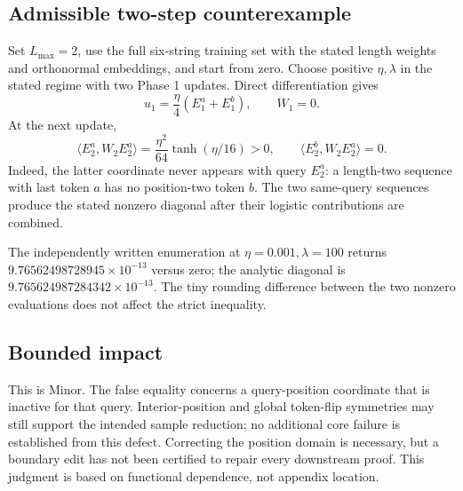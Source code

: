 \documentclass[10pt]{article}
\begin{document}
\subsection*{Admissible two-step counterexample}
Set \(L_{\max}=2\), use the full six-string training set with the stated length weights and orthonormal embeddings, and start from zero. Choose positive \(\eta,\lambda\) in the stated regime with two Phase 1 updates. Direct differentiation gives \[u_1=\frac{\eta}{4}(E_1^a+E_1^b),\qquad W_1=0.\] At the next update, \[\langle E_2^a,W_2E_2^a\rangle
=\frac{\eta^2}{64}\tanh(\eta/16)>0,\qquad
\langle E_2^b,W_2E_2^a\rangle=0.\] Indeed, the latter coordinate never appears with query \(E_2^a\): a length-two sequence with last token \(a\) has no position-two token \(b\). The two same-query sequences produce the stated nonzero diagonal after their logistic contributions are combined.\par
The independently written enumeration at \(\eta=0.001,\lambda=100\) returns \(9.76562498728945\times10^{-13}\) versus zero; the analytic diagonal is \(9.765624987284342\times10^{-13}\). The tiny rounding difference between the two nonzero evaluations does not affect the strict inequality.\par
\subsection*{Bounded impact}
This is Minor. The false equality concerns a query-position coordinate that is inactive for that query. Interior-position and global token-flip symmetries may still support the intended sample reduction; no additional core failure is established from this defect. Correcting the position domain is necessary, but a boundary edit has not been certified to repair every downstream proof. This judgment is based on functional dependence, not appendix location.\par
\end{document}
